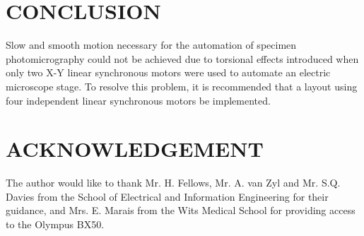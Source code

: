 \documentclass[10pt,twocolumn]{witseiepaper}
\begin{document}
\section{CONCLUSION}

Slow and smooth motion necessary for the automation of specimen
photomicrography could not be achieved due to torsional effects introduced
when only two X-Y linear synchronous motors were used to automate an electric
microscope stage. To resolve this problem, it is recommended that a layout
using four independent linear synchronous motors be implemented.


\section*{ACKNOWLEDGEMENT}

The author would like to thank Mr. H. Fellows, Mr. A. van Zyl and Mr. S.Q.
Davies from the School of Electrical and Information Engineering for their
guidance, and Mrs. E. Marais from the Wits Medical School for providing access
to the Olympus BX50.









\end{document}
